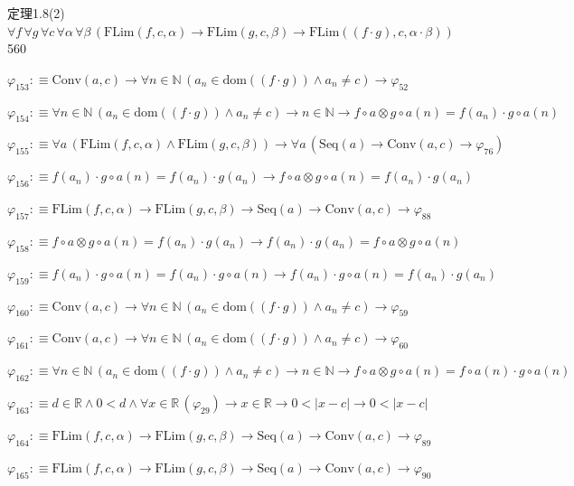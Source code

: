 \begin{fullproof}{定理1.8(2)}{$\forall f\,\forall g\,\forall c\,\forall \alpha\,\forall \beta\,(\mathrm{FLim}(f,c,\alpha) \to \mathrm{FLim}(g,c,\beta) \to \mathrm{FLim}((f \cdot g),c,\alpha \cdot \beta))$}{560}
\begin{abbrevlist}
\item $\varphi_{153} :\equiv \mathrm{Conv}(a,c) \to \forall n \in \mathbb{N}\,(a_{n} \in \mathrm{dom}((f \cdot g)) \land a_{n} \neq c) \to \varphi_{52}$
\item $\varphi_{154} :\equiv \forall n \in \mathbb{N}\,(a_{n} \in \mathrm{dom}((f \cdot g)) \land a_{n} \neq c) \to n \in \mathbb{N} \to f \circ a \otimes g \circ a(n) = f(a_{n}) \cdot g \circ a(n)$
\item $\varphi_{155} :\equiv \forall a\,(\mathrm{FLim}(f,c,\alpha) \land \mathrm{FLim}(g,c,\beta)) \to \forall a\,(\mathrm{Seq}(a) \to \mathrm{Conv}(a,c) \to \varphi_{76})$
\item $\varphi_{156} :\equiv f(a_{n}) \cdot g \circ a(n) = f(a_{n}) \cdot g(a_{n}) \to f \circ a \otimes g \circ a(n) = f(a_{n}) \cdot g(a_{n})$
\item $\varphi_{157} :\equiv \mathrm{FLim}(f,c,\alpha) \to \mathrm{FLim}(g,c,\beta) \to \mathrm{Seq}(a) \to \mathrm{Conv}(a,c) \to \varphi_{88}$
\item $\varphi_{158} :\equiv f \circ a \otimes g \circ a(n) = f(a_{n}) \cdot g(a_{n}) \to f(a_{n}) \cdot g(a_{n}) = f \circ a \otimes g \circ a(n)$
\item $\varphi_{159} :\equiv f(a_{n}) \cdot g \circ a(n) = f(a_{n}) \cdot g \circ a(n) \to f(a_{n}) \cdot g \circ a(n) = f(a_{n}) \cdot g(a_{n})$
\item $\varphi_{160} :\equiv \mathrm{Conv}(a,c) \to \forall n \in \mathbb{N}\,(a_{n} \in \mathrm{dom}((f \cdot g)) \land a_{n} \neq c) \to \varphi_{59}$
\item $\varphi_{161} :\equiv \mathrm{Conv}(a,c) \to \forall n \in \mathbb{N}\,(a_{n} \in \mathrm{dom}((f \cdot g)) \land a_{n} \neq c) \to \varphi_{60}$
\item $\varphi_{162} :\equiv \forall n \in \mathbb{N}\,(a_{n} \in \mathrm{dom}((f \cdot g)) \land a_{n} \neq c) \to n \in \mathbb{N} \to f \circ a \otimes g \circ a(n) = f \circ a(n) \cdot g \circ a(n)$
\item $\varphi_{163} :\equiv d \in \mathbb{R} \land 0 < d \land \forall x \in \mathbb{R}\,(\varphi_{29}) \to x \in \mathbb{R} \to 0 < \lvert x - c \rvert \to 0 < \lvert x - c \rvert$
\item $\varphi_{164} :\equiv \mathrm{FLim}(f,c,\alpha) \to \mathrm{FLim}(g,c,\beta) \to \mathrm{Seq}(a) \to \mathrm{Conv}(a,c) \to \varphi_{89}$
\item $\varphi_{165} :\equiv \mathrm{FLim}(f,c,\alpha) \to \mathrm{FLim}(g,c,\beta) \to \mathrm{Seq}(a) \to \mathrm{Conv}(a,c) \to \varphi_{90}$

\end{abbrevlist}
\end{fullproof}
